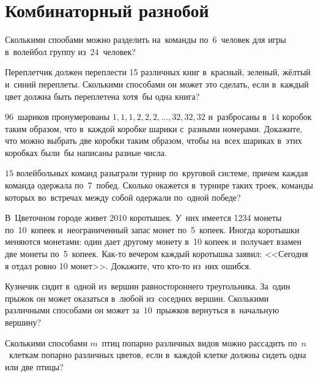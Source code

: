 
\section*{Комбинаторный разнобой}


\begin{problems}

\item
Сколькими спообами можно разделить на~команды по~6~человек для игры в~волейбол
группу из~$24$~человек?

\item
Переплетчик должен переплести 15 различных книг в~красный, зеленый, жёлтый
и~синий переплеты.
Сколькими способами он может это сделать, если в~каждый цвет должна быть
переплетена хотя~бы одна книга?

\item
$96$~шариков пронумерованы $1, 1, 1, 2, 2, 2, \ldots, 32, 32, 32$
и~разбросаны в~$14$ коробок таким образом, что в~каждой коробке шарики
с~разными номерами.
Докажите, что можно выбрать две коробки таким образом, чтобы на~всех шариках
в~этих коробках были~бы написаны разные числа.

\item
$15$ волейбольных команд разыграли турнир по~круговой системе, причем каждая
команда одержала по~7~побед.
Сколько окажется в~турнире таких троек, команды которых во~встречах между собой
одержали по~одной победе?

\item
В~Цветочном городе живет 2010 коротышек.
У~них имеется 1234 монеты по~10~копеек и~неограниченный запас монет
по~5~копеек.
Иногда коротышки меняются монетами: один дает другому монету в~10 копеек
и~получает взамен две монеты по~5~копеек.
Как-то вечером каждый коротышка заявил: <<Сегодня я отдал ровно 10 монет>>.
Докажите, что кто-то из~них ошибся.

\item
Кузнечик сидит в~одной из~вершин равностороннего треугольника.
За~один прыжок он может оказаться в~любой из~соседних вершин.
Сколькими различными способами он может за~$10$~прыжков вернуться в~начальную
вершину?

\item
Сколькими способами $m$~птиц попарно различных видов можно рассадить
по~$n$~клеткам попарно различных цветов, если в~каждой клетке должны сидеть
одна или две птицы?


\end{problems}
